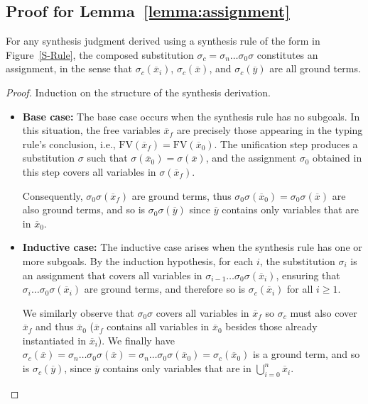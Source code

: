 \documentclass[manuscript,screen]{acmart}
\newcommand{\skhzc}[1]{#1}
\newcommand{\mvhzc}{\text{FV}}
\begin{document}
\subsection{Proof for Lemma~\ref{lemma:assignment}}
\label{sec:appendix-lemma2}
\begin{lemma}
For any synthesis judgment derived using a synthesis rule of the form in Figure~\ref{S-Rule}, the composed substitution $\sigma_c = \sigma_n \ldots \sigma_0 \sigma$ constitutes an assignment, in the sense that $\sigma_c(\skhzc{\overline{x}_i})$, $\sigma_c(\skhzc{\overline{x}})$, and $\sigma_c(\skhzc{\overline{y}})$ are all ground terms.
\end{lemma}
\begin{proof}
Induction on the structure of the synthesis derivation.
\begin{itemize}
 \item \textbf{Base case:} The base case occurs when the synthesis rule has no subgoals. In this situation, the free variables $\overline{x}_f$ are precisely those appearing in the typing rule's conclusion, i.e., $\mvhzc(\overline{x}_f) = \mvhzc(\overline{x}_0)$. The unification step produces a substitution $\sigma$ such that $\sigma(\overline{x}_0) = \sigma(\overline{x})$, and the assignment $\sigma_0$ obtained in this step covers all variables in $\sigma(\overline{x}_f)$. 

 Consequently, $\sigma_0\sigma(\overline{x}_f)$ are ground terms, thus $\sigma_0\sigma(\overline{x}_0) = \sigma_0\sigma(\overline{x})$ are also ground terms, and so is $\sigma_0\sigma(\overline{y})$ since $\overline{y}$ contains only variables that are in $\overline{x}_0$.

 \item \textbf{Inductive case:} The inductive case arises when the synthesis rule has one or more subgoals. By the induction hypothesis, for each $i$, the substitution $\sigma_i$ is an assignment that covers all variables in $\sigma_{i-1}\ldots\sigma_0\sigma(\overline{x}_i)$, ensuring that $\sigma_{i}\ldots\sigma_0\sigma(\overline{x}_i)$ are ground terms, and therefore so is $\sigma_c(\overline{x}_i)$ for all $i\ge1$.

 We similarly observe that $\sigma_0\sigma$ covers all variables in $\overline{x}_f$ so $\sigma_c$ must also cover $\overline{x}_f$ and thus $\overline{x}_0$ ($\overline{x}_f$ contains all variables in $\overline{x}_0$ besides those already instantiated in $\overline{x}_i$). 
 We finally have $\sigma_c(\overline{x}) = \sigma_n \ldots \sigma_0 \sigma(\overline{x}) = \sigma_n \ldots \sigma_0 \sigma(\overline{x}_0) = \sigma_c(\overline{x}_0)$ is a ground term, and so is $\sigma_c(\overline{y})$, since $\overline{y}$ contains only variables that are in $\bigcup_{i=0}^n\overline{x}_i$.
 \end{itemize}
\end{proof}
\end{document}
